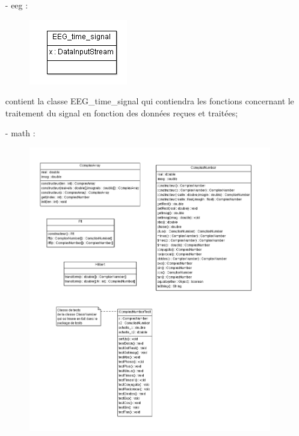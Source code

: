 	\begin{itemize}
			
	\item [-] eeg : 
		\begin{figure}[h!]
			\centering
		    \includegraphics []{../diagramme_classes/eeg.png} \\
			\label{fig_eeg}
  		\end{figure}
	 contient la classe EEG\_time\_signal qui contiendra les fonctions concernant le traitement du signal en fonction des données reçues et traitées;
	\item [-] math :
		\begin{figure}[h!]
			\centering
		    \includegraphics [scale=0.5]{../diagramme_classes/math.png} 

\end{figure}
\end{itemize}
